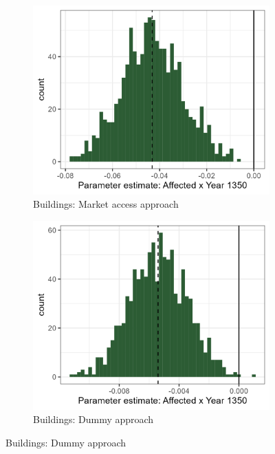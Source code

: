 \begin{figure}
\begin{subfigure}[b]{0.45\textwidth}
    \end{subfigure}
    \vspace{0.45cm}
    \begin{subfigure}[b]{0.45\textwidth}
        \centering
        \caption{Buildings: Market access approach} \label{fig:distri_c_norm}
        \includegraphics[width=\textwidth]{Plots/Regression_plots/arch_MA_buildings_boot_norm.png}
    \end{subfigure}
    \hfill
    \begin{subfigure}[b]{0.45\textwidth}
        \centering
        \caption{Buildings: Dummy approach} \label{fig:distri_d_norm}
        \includegraphics[width=\textwidth]{Plots/Regression_plots/arch_dummy_buildings_boot_norm.png}
    \end{subfigure}
    \label{fig:arch_reg_boot1}
\end{figure}


